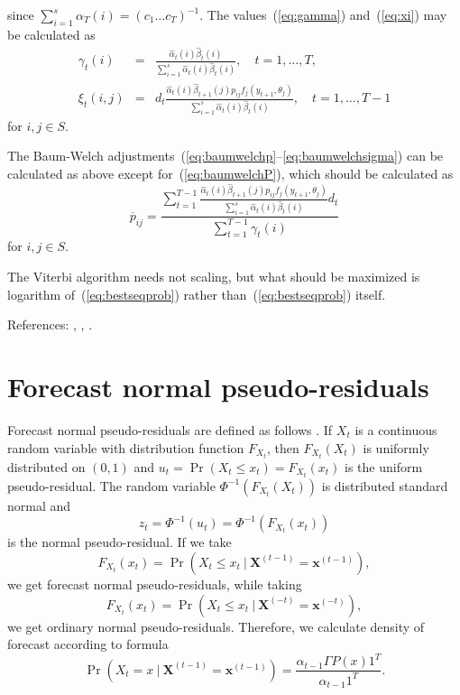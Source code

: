 since $\sum_{i = 1}^s \alpha_T(i) = (c_1 \ldots c_T)^{-1}$.
The values~(\ref{eq:gamma}) and~(\ref{eq:xi}) may be calculated as
\begin{eqnarray}
  \label{eq:gammabyscaled}
  \gamma_t(i) & = & \frac{\hat{\alpha}_t(i)\hat{\beta}_t(i)}{\sum_{i =
      1}^s \hat{\alpha}_t(i) \hat{\beta}_t(i)}, \hspace{1em} t = 1,
  \ldots, T, \\
  \label{eq:xibyscaled}
  \xi_t(i, j) & = & d_t\frac{\hat{\alpha}_t(i)\hat{\beta}_{t +
      1}(j)p_{ij} f_j(y_{t + 1}, \theta_j)}{\sum_{i = 1}^s
    \hat{\alpha}_t(i) \hat{\beta}_t(i)},
  \hspace{1em} t = 1, \ldots, T - 1
\end{eqnarray}
for $i, j \in S$.

The Baum-Welch
adjustments~(\ref{eq:baumwelchp}--\ref{eq:baumwelchsigma}) can be
calculated as above except for~(\ref{eq:baumwelchP}), which should be
calculated as
\begin{equation}
  \label{eq:baumwelchPscaled}
  \overline{p}_{ij} = \frac{\sum_{t = 1}^{T - 1} \frac{\hat{\alpha}_t(i)
      \hat{\beta}_{t + 1}(j) p_{ij} f_j(y_{t + 1}, \theta_j)}{\sum_{i =
        1}^s \hat{\alpha}_t(i) \hat{\beta}_t(i)}d_t }{\sum_{t = 1}^{T - 1}
    \gamma_t(i)}
\end{equation}
for $i, j \in S$.

The Viterbi algorithm needs not scaling, but what should be maximized
is logarithm of~(\ref{eq:bestseqprob}) rather
than~(\ref{eq:bestseqprob}) itself.

References: \cite{rabiner-1989}, \cite{baum-petrie-soules-weiss-1970},
\cite{cappe-moulines-ryden-2005}.

\section{Forecast normal pseudo-residuals}

Forecast normal pseudo-residuals are defined as follows \cite [p.~97]
{zucchini-macdonald-2009}. If $X_t$ is a continuous random variable
with distribution function $F_{X_t}$, then $F_{X_t}(X_t)$ is uniformly
distributed on $(0, 1)$ and $u_t = \Pr(X_t \leq x_t) = F_{X_t}(x_t)$
is the uniform pseudo-residual. The random variable
$\Phi^{-1}(F_{X_t}(X_t))$ is distributed standard normal and
\[
z_t = \Phi^{-1}(u_t) = \Phi^{-1}(F_{X_t}(x_t))
\]
is the normal pseudo-residual. If we take
\[
F_{X_t}(x_t) = \Pr(X_t \leq x_t\ |\ \mathbf{X}^{(t - 1)} =
\mathbf{x}^{(t - 1)}),
\]
we get forecast normal pseudo-residuals, while taking
\[
F_{X_t}(x_t) = \Pr(X_t \leq x_t\ |\ \mathbf{X}^{(-t)} =
\mathbf{x}^{(-t)}),
\]
we get ordinary normal pseudo-residuals. Therefore, we calculate
density of forecast according to formula
\[
\Pr(X_t = x\ |\ \mathbf{X}^{(t - 1)} = \mathbf{x}^{(t - 1)})
= \frac{\alpha_{t - 1} \Gamma P(x) 1^T}{\alpha_{t - 1} 1^T}.
\]
